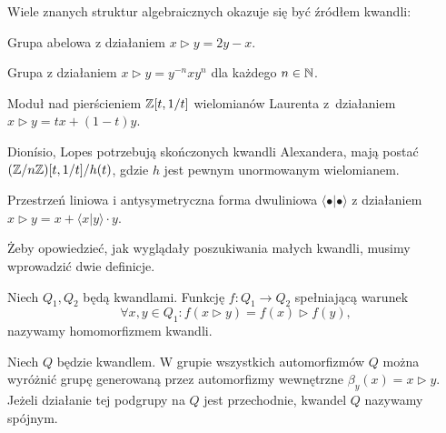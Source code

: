 Wiele znanych struktur algebraicznych okazuje się być źródłem kwandli:

\begin{example}
%
%
    Grupa abelowa z działaniem $x \triangleright y = 2y - x$.
\end{example}

\begin{example}
%
    Grupa z działaniem $x \triangleright y = y^{-n} x y^n$ dla każdego $n \in \mathbb N$.
\end{example}

\begin{example}
%
    Moduł nad pierścieniem $\mathbb Z[t, 1/t]$ wielomianów Laurenta z~działaniem $x \triangleright y = tx + (1-t) y$.
\end{example}

Dionísio, Lopes \cite[s. 1043]{lopes2003} potrzebują skończonych kwandli Alexandera, mają postać $(\mathbb Z/n\mathbb Z)[t, 1/t] / h(t)$, gdzie $h$ jest pewnym unormowanym wielomianem.

\begin{example}
%
    Przestrzeń liniowa i antysymetryczna forma dwuliniowa $\langle \bullet | \bullet \rangle$ z działaniem $x \triangleright y = x + \langle x | y \rangle \cdot y$.
\end{example}

Żeby opowiedzieć, jak wyglądały poszukiwania małych kwandli, musimy wprowadzić dwie definicje.

\begin{definition}
    Niech $Q_1, Q_2$ będą kwandlami.
    Funkcję $f \colon Q_1 \to Q_2$ spełniającą warunek
    \begin{equation}
        \forall x, y \in Q_1 : f(x \triangleright y) = f(x) \triangleright f(y),
    \end{equation}
    nazywamy homomorfizmem kwandli.
\end{definition}

\begin{definition}
%
    Niech $Q$ będzie kwandlem.
    W grupie wszystkich automorfizmów $Q$ można wyróżnić grupę generowaną przez automorfizmy wewnętrzne $\beta_y(x) = x \triangleright y$.
    Jeżeli działanie tej podgrupy na $Q$ jest przechodnie, kwandel $Q$ nazywamy spójnym.
\end{definition}

